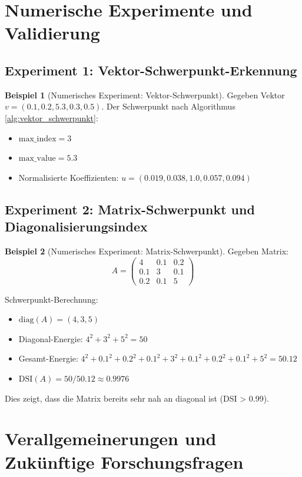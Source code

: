 \documentclass[a4paper,12pt]{article}
\theoremstyle{definition}
\newtheorem{beispiel}{Beispiel}
\begin{document}
\section{Numerische Experimente und Validierung}

\subsection{Experiment 1: Vektor-Schwerpunkt-Erkennung}

\begin{beispiel}[Numerisches Experiment: Vektor-Schwerpunkt]
Gegeben Vektor $v = (0.1, 0.2, 5.3, 0.3, 0.5)$. Der Schwerpunkt nach Algorithmus \ref{alg:vektor_schwerpunkt}:
\begin{itemize}
\item $\text{max\_index} = 3$
\item $\text{max\_value} = 5.3$
\item Normalisierte Koeffizienten: $u = (0.019, 0.038, 1.0, 0.057, 0.094)$
\end{itemize}
\end{beispiel}

\subsection{Experiment 2: Matrix-Schwerpunkt und Diagonalisierungsindex}

\begin{beispiel}[Numerisches Experiment: Matrix-Schwerpunkt]
Gegeben Matrix:
\[
A = \begin{pmatrix} 4 & 0.1 & 0.2 \\ 0.1 & 3 & 0.1 \\ 0.2 & 0.1 & 5 \end{pmatrix}
\]

Schwerpunkt-Berechnung:
\begin{itemize}
\item $\text{diag}(A) = (4, 3, 5)$
\item Diagonal-Energie: $4^2 + 3^2 + 5^2 = 50$
\item Gesamt-Energie: $4^2 + 0.1^2 + 0.2^2 + 0.1^2 + 3^2 + 0.1^2 + 0.2^2 + 0.1^2 + 5^2 = 50.12$
\item $\text{DSI}(A) = 50 / 50.12 \approx 0.9976$
\end{itemize}

Dies zeigt, dass die Matrix bereits sehr nah an diagonal ist (DSI > 0.99).
\end{beispiel}

\section{Verallgemeinerungen und Zukünftige Forschungsfragen}
\end{document}
